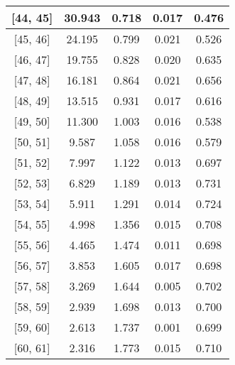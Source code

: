 \documentclass[12pt]{article}
\begin{document}
\begin{table}[]
\begin{tabular}{c|c|c|c|c|}
\multicolumn{1}{|c|}{{[}44,  45{]}}  & 30.943 & 0.718 & 0.017 & 0.476 \\ \hline 
\multicolumn{1}{|c|}{{[}45,  46{]}}  & 24.195 & 0.799 & 0.021 & 0.526 \\ \hline 
\multicolumn{1}{|c|}{{[}46,  47{]}}  & 19.755 & 0.828 & 0.020 & 0.635 \\ \hline 
\multicolumn{1}{|c|}{{[}47,  48{]}}  & 16.181 & 0.864 & 0.021 & 0.656 \\ \hline 
\multicolumn{1}{|c|}{{[}48,  49{]}}  & 13.515 & 0.931 & 0.017 & 0.616 \\ \hline 
\multicolumn{1}{|c|}{{[}49,  50{]}}  & 11.300 & 1.003 & 0.016 & 0.538 \\ \hline 
\multicolumn{1}{|c|}{{[}50,  51{]}}  & 9.587 & 1.058 & 0.016 & 0.579 \\ \hline 
\multicolumn{1}{|c|}{{[}51,  52{]}}  & 7.997 & 1.122 & 0.013 & 0.697 \\ \hline 
\multicolumn{1}{|c|}{{[}52,  53{]}}  & 6.829 & 1.189 & 0.013 & 0.731 \\ \hline 
\multicolumn{1}{|c|}{{[}53,  54{]}}  & 5.911 & 1.291 & 0.014 & 0.724 \\ \hline 
\multicolumn{1}{|c|}{{[}54,  55{]}}  & 4.998 & 1.356 & 0.015 & 0.708 \\ \hline 
\multicolumn{1}{|c|}{{[}55,  56{]}}  & 4.465 & 1.474 & 0.011 & 0.698 \\ \hline 
\multicolumn{1}{|c|}{{[}56,  57{]}}  & 3.853 & 1.605 & 0.017 & 0.698 \\ \hline 
\multicolumn{1}{|c|}{{[}57,  58{]}}  & 3.269 & 1.644 & 0.005 & 0.702 \\ \hline 
\multicolumn{1}{|c|}{{[}58,  59{]}}  & 2.939 & 1.698 & 0.013 & 0.700 \\ \hline 
\multicolumn{1}{|c|}{{[}59,  60{]}}  & 2.613 & 1.737 & 0.001 & 0.699 \\ \hline 
\multicolumn{1}{|c|}{{[}60,  61{]}}  & 2.316 & 1.773 & 0.015 & 0.710 \\ \hline 
\end{tabular}
\end{table}
\end{document}
